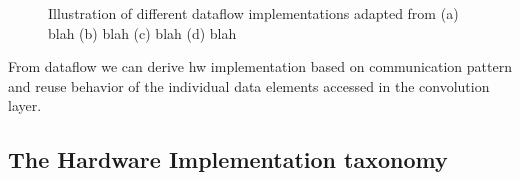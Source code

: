 \begin{figure}
    \centering
    \hspace{0.1cm} 
    \hspace{0.1cm} 
    \hspace{0.1cm} 
    \caption{Illustration of different dataflow implementations adapted from \cite{dnn_df_overrated} (a) blah (b) blah (c) blah (d) blah}
    \label{fig:unroll_illustration}
\end{figure}


From dataflow we can derive hw implementation based on communication pattern and
reuse behavior of the individual data elements accessed in the convolution
layer.

\subsection{The Hardware Implementation taxonomy}

